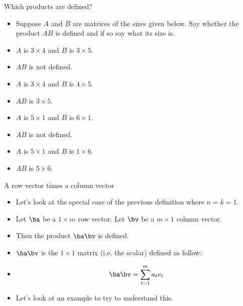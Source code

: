 \documentclass{beamer}
\begin{document}
\begin{frame}{Which products are defined?}

\begin{itemize}
\item Suppose $A$ and $B$ are matrices of the sizes given below. Say
whether the product $A B$ is defined and if so say what its size is.
\item $A$ is $3\times 4$ and $B$ is $3\times 5$.
\item  $A B$ is not defined.
\item $A$ is $3 \times 4$ and $B$ is $4 \times 5$.
\item $A B$ is $3 \times 5$.
\item $A$ is $5\times 1$ and $B$ is $6\times 1$.
\item $A B$ is not defined.
\item $A$ is $5\times 1$ and $B$ is $1\times 6$.
\item $A B$ is $5\times 6$.
\end{itemize}

\end{frame}


\begin{frame}{A row vector times a column vector}

\begin{itemize}
\item Let's look at the special case of the previous definition where $n=k=1$.
\item Let $\ba$ be a $1\times m$ row vector. Let $\bv$ be a $m\times 1$ column vector.
\item Then the product $\ba \bv$ is defined.
\item $\ba \bv$ is the $1\times 1$ matrix (i.e. the scalar) defined as follow:
\item $$\ba \bv  = \sum_{t=1}^m a_t v_t$$
\item Let's look at an example to try to understand this.
\end{itemize}

\end{frame}

\end{document}
